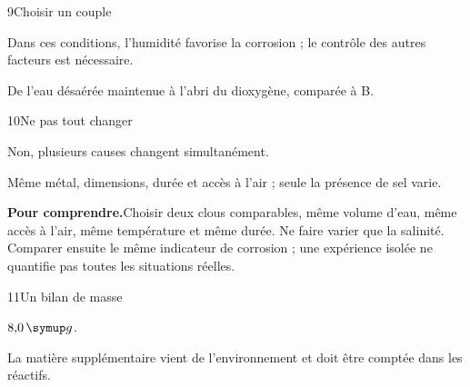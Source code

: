 \par\noindent\begin{minipage}{\linewidth}
\begin{corrige}{9}{Choisir un couple}
\begin{questions}
\item Dans ces conditions, l’humidité favorise la corrosion ; le contrôle des autres facteurs est nécessaire.
\item De l’eau désaérée maintenue à l’abri du dioxygène, comparée à B.
\end{questions}
\end{corrige}
\end{minipage}
\par\noindent\begin{minipage}{\linewidth}
\begin{corrige}{10}{Ne pas tout changer}
\begin{questions}
\item Non, plusieurs causes changent simultanément.
\item Même métal, dimensions, durée et accès à l’air ; seule la présence de sel varie.
\end{questions}
\par\smallskip\noindent\textbf{Pour comprendre.}\enspace Choisir deux clous comparables, même volume d’eau, même accès à l’air, même température et même durée. Ne faire varier que la salinité. Comparer ensuite le même indicateur de corrosion ; une expérience isolée ne quantifie pas toutes les situations réelles.\par
{}
\end{corrige}
\end{minipage}
\par\noindent\begin{minipage}{\linewidth}
\begin{corrige}{11}{Un bilan de masse}
\begin{questions}
\item $8{,}0\unite g$.
\item La matière supplémentaire vient de l’environnement et doit être comptée dans les réactifs.
\end{questions}
\end{corrige}
\end{minipage}
